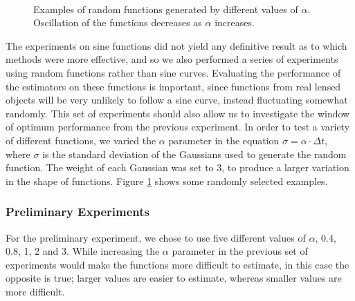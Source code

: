 \documentclass[a4paper,11pt,twoside]{article}
\begin{document}
\begin{figure}
{   }\\
   \begin{center}
   \end{center}
   \caption{Examples of random functions generated by different
   values of $\alpha$. Oscillation of the functions decreases as $\alpha$ increases.}
   \label{fig:randex}
   \end{figure}
   The experiments on sine functions did not yield any definitive result as to
   which methods were more effective, and so we also performed a series of
   experiments using random functions rather than sine curves. Evaluating the
   performance of the estimators on these functions is important, since
   functions from real lensed objects will be very unlikely to follow a sine
   curve, instead fluctuating somewhat randomly. This set of experiments should
   also allow us to investigate the window of optimum performance from the
   previous experiment. In order to test a variety of different functions, we
   varied the $\alpha$ parameter in the equation $\sigma=\alpha\cdot\Delta t$,
   where $\sigma$ is the standard deviation of the Gaussians used to generate
   the random function. The weight of each Gaussian was set to 3, to produce a
   larger variation in the shape of functions. Figure \ref{fig:randex} shows
   some randomly selected examples.
\subsubsection{Preliminary Experiments}
\label{sec-8-2-1}

    For the preliminary experiment, we chose to use five different values of
    $\alpha$, 0.4, 0.8, 1, 2 and 3. While increasing the $\alpha$ parameter in the
    previous set of experiments would make the functions more difficult to estimate,
    in this case the opposite is true; larger values are easier to estimate, whereas
    smaller values are more difficult.
    
\end{document}
